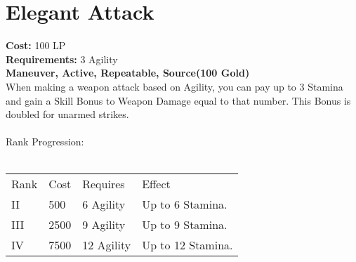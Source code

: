 \section{Elegant Attack}\label{maneuver:elegantAttack}
\textbf{Cost:} 100 LP\\
\textbf{Requirements:} 3 Agility\\
\textbf{Maneuver, Active, Repeatable, Source(100 Gold)}\\
When making a weapon attack based on Agility, you can pay up to 3 Stamina and gain a Skill Bonus to Weapon Damage equal to that number.
This Bonus is doubled for unarmed strikes.\\
\\
Rank Progression:\\
\\
\begin{tabular}{l | l | l | l}
	Rank & Cost & Requires & Effect\\
	II & 500 & 6 Agility & Up to 6 Stamina.\\
	III & 2500 & 9 Agility & Up to 9 Stamina.\\
	IV & 7500 & 12 Agility & Up to 12 Stamina.\\
\end{tabular}